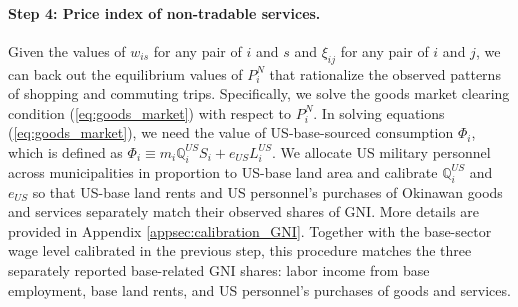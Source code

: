 \documentclass[12pt, unicode, a4paper]{article}
\newcommand{\1}{\mbox{1}\hspace{-0.25em}\mbox{l}} %
\begin{document}
        
\paragraph{Step 4: Price index of non-tradable services.}
Given the values of $w_{is}$ for any pair of $i$ and $s$ and $\xi_{ij}$ for any pair of $i$ and $j$, we can back out the equilibrium values of $P_i^N$ that rationalize the observed patterns of shopping and commuting trips. Specifically, we solve the goods market clearing condition (\ref{eq:goods_market}) with respect to $P_i^N$.
In solving equations (\ref{eq:goods_market}), we need the value of US-base-sourced consumption $\Phi_i$, which is defined as $\Phi_i \equiv m_i\mathbb{Q}_i^{US}S_i+e_{US}L_i^{US}$. We allocate US military personnel across municipalities in proportion to US-base land area and calibrate $\mathbb{Q}_i^{US}$ and $e_{US}$ so that US-base land rents and US personnel's purchases of Okinawan goods and services separately match their observed shares of GNI. More details are provided in Appendix \ref{appsec:calibration_GNI}. Together with the base-sector wage level calibrated in the previous step, this procedure matches the three separately reported base-related GNI shares: labor income from base employment, base land rents, and US personnel's purchases of goods and services.
\end{document}
